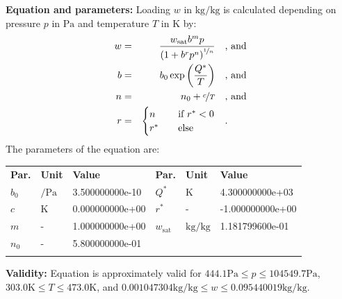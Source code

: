 \textbf{Equation and parameters:}
\newline
%
Loading $w$ in $\si{\kilogram\per\kilogram}$ is calculated depending on pressure $p$ in $\si{\pascal}$ and temperature $T$ in $\si{\kelvin}$ by:
%
\begin{equation*}
\begin{split}
w &=& \frac{w_\mathrm{sat} b^{m} p}{\left( 1 + b^{r} p^{n} \right)^{\nicefrac{1}{n}}} & \quad\text{, and} \\
b &=& b_0 \exp\left( \frac{Q^{*}}{T} \right) & \quad\text{, and} \\
n &=& n_0 + \nicefrac{c}{T} & \quad\text{, and} \\
r &=& \begin{cases} n & \quad \text{if } r^{*} < 0 \\ r^{*}  & \quad \text{else} \end{cases} & \quad\text{.}
\end{split}
\end{equation*}
%
The parameters of the equation are:
%
\begin{longtable}[l]{lll|lll}
\toprule
\addlinespace
\textbf{Par.} & \textbf{Unit} & \textbf{Value} &	\textbf{Par.} & \textbf{Unit} & \textbf{Value} \\
\addlinespace
\midrule
\endhead

\bottomrule
\endfoot
\bottomrule
\endlastfoot
\addlinespace

$b_0$ & $\si{\per\pascal}$ & 3.500000000e-10 & $Q^{*}$ & $\si{\kelvin}$ & 4.300000000e+03 \\
$c$ & $\si{\kelvin}$ & 0.000000000e+00 & $r^{*}$ & - & -1.000000000e+00 \\
$m$ & - & 1.000000000e+00 & $w_\mathrm{sat}$ & $\si{\kilogram\per\kilogram}$ & 1.181799600e-01 \\
$n_0$ & - & 5.800000000e-01 & & & \\

\addlinespace\end{longtable}

\textbf{Validity:}
\newline
Equation is approximately valid for $444.1 \si{\pascal} \leq p \leq 104549.7 \si{\pascal}$,  $303.0 \si{\kelvin} \leq T \leq 473.0 \si{\kelvin}$, and $0.001047304 \si{\kilogram\per\kilogram} \leq w \leq 0.095440019 \si{\kilogram\per\kilogram}$.
\newline

